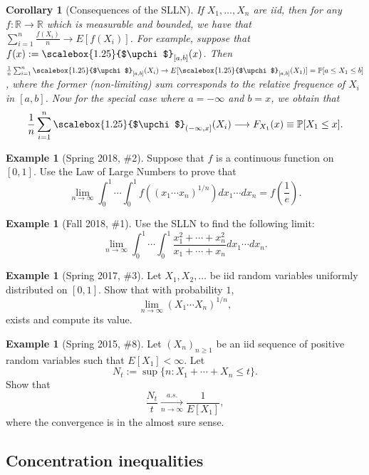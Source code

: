 \documentclass[12pt,reqno]{article}
\theoremstyle{plain}
\newtheorem{cor}[theorem]{Corollary}
\theoremstyle{definition}
\newtheorem{example}[theorem]{Example}
\renewcommand{\chi}{\scalebox{1.25}{$\upchi$}}
\begin{document}
\begin{cor}[Consequences of the SLLN] 
If $X_1,\ldots,X_n$ are iid, then for any $f: \mathbb{R} \rightarrow \mathbb{R}$ which is 
measurable and bounded, we have that 
$\sum_{i=1}^n \frac{f(X_i)}{n} \rightarrow E[f(X_i)]$. For example, suppose that 
$f(x) := \chi_{[a,b]}(x)$. Then 
$\frac{1}{n} \sum_{i=1}^n \chi_{[a,b]}(X_i) \rightarrow E[\chi_{[a,b]}(X_1)] = 
 \mathbb{P}[a \leq X_1 \leq b]$, where the former (non-limiting) sum corresponds to the 
relative frequence of $X_i$ in $[a,b]$. Now for the special case where 
$a = -\infty$ and $b = x$, we obtain that 
\[
\frac{1}{n} \sum_{i=1}^n \chi_{(-\infty,x]}(X_i) \longrightarrow F_{X_1}(x) \equiv 
     \mathbb{P}[X_1 \leq x]. 
\]
\end{cor} 

\begin{example}[Spring 2018, \#2]
Suppose that $f$ is a continuous function on $[0,1]$. Use the Law of 
Large Numbers to prove that 
\[
\lim_{n \rightarrow \infty} \int_0^1\cdots\int_0^1 
     f\left((x_1\cdots x_n)^{1/n}\right) dx_1\cdots dx_n = 
     f\left(\frac{1}{e}\right). 
\]
\end{example} 

\begin{example}[Fall 2018, \#1]
Use the SLLN to find the following limit:
\[
\lim_{n \rightarrow \infty} \int_0^1 \cdots \int_0^1 
     \frac{x_1^2+\cdots+x_n^2}{x_1+\cdots+x_n} dx_1\cdots dx_n. 
\]
\end{example} 

\begin{example}[Spring 2017, \#3]
Let $X_1,X_2,\ldots$ be iid random variables uniformly distributed on $[0,1]$. 
Show that with probability $1$, 
\[
\lim_{n \rightarrow \infty} (X_1 \cdots X_n)^{1/n}, 
\]
exists and compute its value. 
\end{example} 

\begin{example}[Spring 2015, \#8]
Let $(X_n)_{n \geq 1}$ be an iid sequence of positive random variables 
such that $E[X_1] < \infty$. Let 
\[
N_t := \sup \{n: X_1+\cdots+X_n \leq t\}. 
\]
Show that 
\[
\frac{N_t}{t} \xrightarrow[n \rightarrow \infty]{a.s.} \frac{1}{E[X_1]}, 
\]
where the convergence is in the almost sure sense. 
\end{example} 

\subsection{Concentration inequalities} 
\end{document}
